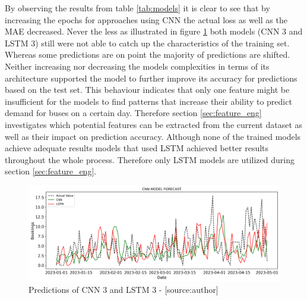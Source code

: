 By observing the results from table \ref{tab:models} it is clear to see that by increasing the epochs for approaches using CNN the actual loss as well as the MAE decreased. Never the less as illustrated in figure \ref{fig:combined_model} both models (CNN 3 and LSTM 3) still were not able to catch up the characteristics of the training set. Whereas some predictions are on point the majority of predictions are shifted. Neither increasing nor decreasing the models complexities in terms of its architecture supported the model to further improve its accuracy for predictions based on the test set.
This behaviour indicates that only one feature might be insufficient for the models to find patterns that increase their ability to predict demand for buses on a certain day.
Therefore section \ref{sec:feature_eng} investigates which potential features can be extracted from the current dataset as well as their impact on prediction accuracy. Although none of the trained models achieve adequate results models that used LSTM achieved better results throughout the whole process. Therefore only LSTM models are utilized during section \ref{sec:feature_eng}.
\begin{figure}[H]
	\centering
		\includegraphics[width=14cm]{images/combined_prediction}
	\caption{Predictions of CNN 3 and LSTM 3 - [source:author]}
	\label{fig:combined_model}
\end{figure}

